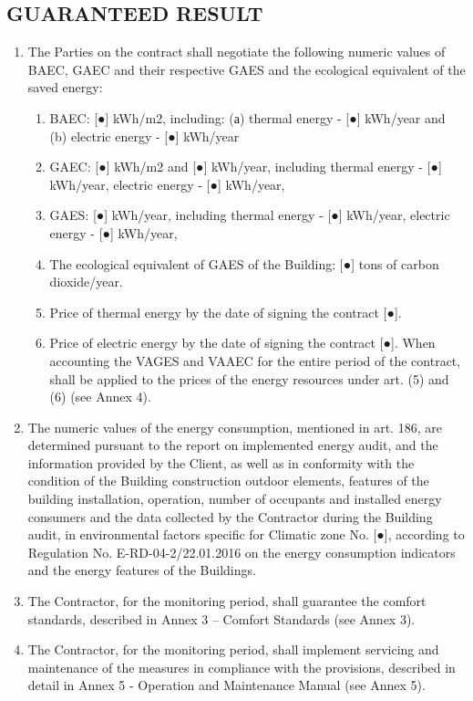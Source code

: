 \subsection{GUARANTEED RESULT}
\begin{enumerate}
\item The Parties on the contract shall negotiate the following
  numeric values of BAEC, GAEC and their respective GAES and the
  ecological equivalent of the saved energy:
  \begin{enumerate}
  \item BAEC: [●] kWh/m2, including: (а) thermal energy {-} [●] kWh/year
    and (b) electric energy {-} [●] kWh/year
  \item GAEC: [●] kWh/m2 and [●] kWh/year, including thermal energy -
    [●] kWh/year, electric energy {-} [●] kWh/year,
  \item GAES: [●] kWh/year, including thermal energy {-} [●] kWh/year,
    electric energy {-} [●] kWh/year,
  \item The ecological equivalent of GAES of the Building: [●] tons of
    carbon dioxide/year.
  \item Price of thermal energy by the date of signing the contract
    [●].
  \item Price of electric energy by the date of signing the contract
    [●]. When accounting the VAGES and VAAEC for the entire period of
    the contract, shall be applied to the prices of the energy
    resources under art. (5) and (6) (see Annex 4).
  \end{enumerate}

\item The numeric values of the energy consumption, mentioned in
  art. 186, are determined pursuant to the report on implemented
  energy audit, and the information provided by the Client, as well as
  in conformity with the condition of the Building construction
  outdoor elements, features of the building installation, operation,
  number of occupants and installed energy consumers and the data
  collected by the Contractor during the Building audit, in
  environmental factors specific for Climatic zone No. [●], according
  to Regulation No. E{-}RD{-}04{-}2/22.01.2016 on the energy consumption
  indicators and the energy features of the Buildings.
\item The Contractor, for the monitoring period, shall guarantee the
  comfort standards, described in Annex 3 – Comfort Standards (see
  Annex 3).
\item The Contractor, for the monitoring period, shall implement
  servicing and maintenance of the measures in compliance with the
  provisions, described in detail in Annex 5 {-} Operation and
  Maintenance Manual (see Annex 5).
\end{enumerate}

